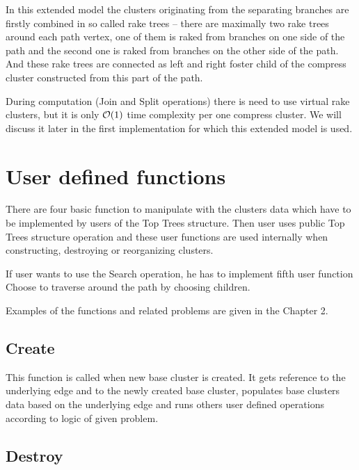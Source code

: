 In this extended model the clusters originating from the separating branches are
firstly combined in so called {\I rake trees} -- there are maximally two rake
trees around each path vertex, one of them is raked from branches on one side of
the path and the second one is raked from branches on the other side of the
path. And these rake trees are connected as left and right foster child of the
compress cluster constructed from this part of the path.


During computation ({\sc Join} and {\sc Split} operations) there is need to use
virtual rake clusters, but it is only ${\cal O}(1)$ time complexity per one compress
cluster. We will discuss it later in the first implementation for which this
extended model is used.



\section{User defined functions}

There are four basic function to manipulate with the clusters data which have to
be implemented by users of the Top Trees structure. Then user uses public Top
Trees structure operation and these user functions are used internally when
constructing, destroying or reorganizing clusters.

If user wants to use the {\I Search} operation, he has to implement fifth user
function {\I Choose} to traverse around the path by choosing children.

Examples of the functions and related problems are given in the Chapter 2.

\subsection{Create}

This function is called when new base cluster is created. It gets reference to
the underlying edge and to the newly created base cluster, populates base
clusters data based on the underlying edge and runs others user defined
operations according to logic of given problem.

\subsection{Destroy}

